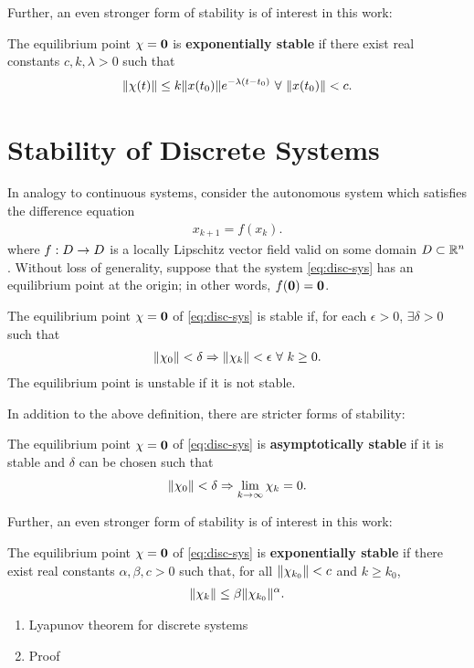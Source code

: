 Further, an even stronger form of stability is of interest in this work:
\begin{definition}
  The equilibrium point $\chi = {\mathbf 0}$ is {\bf exponentially stable} if there
  exist real constants $c, k, \lambda > 0$ such that
  \begin{align*}
    \nxt \leq k \nxtnaught e^{-\lambda (t - t_{0})} \ \forall \ \nxtnaught
    < c.
  \end{align*}
\end{definition}


\section{Stability of Discrete Systems}

In analogy to continuous systems, consider the autonomous system which satisfies
the difference equation
\begin{align}
  \label{eq:disc-sys}
  x_{k+1} = f(x_{k}).
\end{align}
where $f : D \to D$ is a locally Lipschitz vector field valid on some domain
$D \subset \mathbb{R}^{n}$.
%
Without loss of generality, suppose that the system \eqref{eq:disc-sys} has an
equilibrium point at the origin;
%
in other words, $f({\mathbf 0}) = {\mathbf 0}$.
%
\begin{definition}
  The equilibrium point $\chi = {\mathbf 0}$ of \eqref{eq:disc-sys} is stable if, for each $\epsilon > 0$,
  $\exists \delta > 0$ such that
  \begin{align*}
    \|\chi_{0}\| < \delta \Rightarrow \|\chi_{k}\| < \epsilon \ \forall \ k
    \geq 0.
  \end{align*}
  The equilibrium point is unstable if it is not stable.
\end{definition}

In addition to the above definition, there are stricter forms of stability:
\begin{definition}
  The equilibrium point $\chi = {\mathbf 0}$ of \eqref{eq:disc-sys} is {\bf asymptotically stable} if it is
  stable and $\delta$ can be chosen such that
  \begin{align*}
    \|\chi_{0}\| < \delta \Rightarrow \lim_{k \to \infty} \chi_{k} = 0.
  \end{align*}
\end{definition}

Further, an even stronger form of stability is of interest in this work:
\begin{definition}
  The equilibrium point $\chi = {\mathbf 0}$ of \eqref{eq:disc-sys} is {\bf
    exponentially stable} if there exist real constants $\alpha, \beta, c> 0$
  such that, for all $\|\chi_{k_{0}}\| < c$ and $k \geq k_{0}$,
  \begin{align*}
    \|\chi_{k}\| \leq \beta \|\chi_{k_{0}}\|^{\alpha}.
  \end{align*}
\end{definition}



\begin{enumerate}
\item Lyapunov theorem for discrete systems
\item Proof
\end{enumerate}